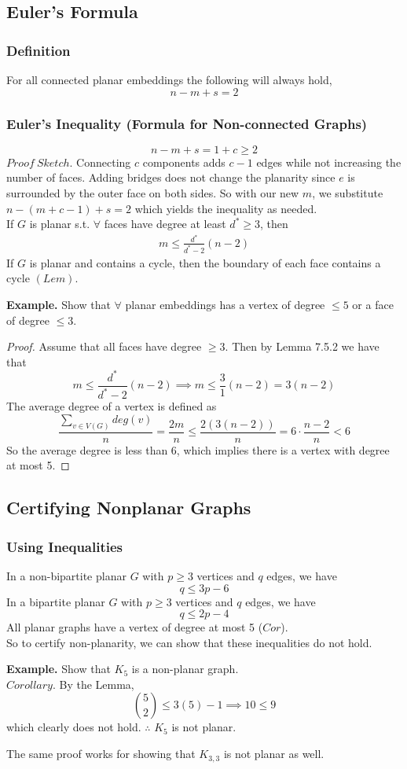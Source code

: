 \documentclass[11pt]{article}
\newenvironment{eg}[1]{
\begin{tcolorbox}[colback = white!15, arc=0pt,outer arc=0pt, colframe = black]
{\color{black} \textbf{Example.} #1} \\[5pt]
}
{
\end{tcolorbox}
}
\newcommand{\nl}{\\[5pt]}
\begin{document}
\subsection{Euler's Formula}
\subsubsection{Definition}
For all connected planar embeddings the following will always hold, 
$$n-m+s = 2$$

\subsubsection{Euler's Inequality (Formula for Non-connected Graphs)}
$$n -m + s = 1 + c \geq 2$$ 
$Proof \: Sketch.$ Connecting $c$ components adds $c-1$ edges while not increasing the number of faces. Adding bridges does not change the planarity since $e$ is surrounded by the outer face on both sides. So with our new $m$, we substitute $n- (m+c-1) +s = 2$ which yields the inequality as needed. \hfill \qedsymbol \nl
If $G$ is planar s.t. $\forall$ faces have degree at least $d^* \geq 3$, then 
\begin{align*}m \leq \frac{d^*}{d^*-2}(n-2) \tag*{$(Lem \: 7.5.2)$}\end{align*}
If $G$ is planar and contains a cycle, then the boundary of each face contains a cycle $(Lem)$.
\begin{eg}{Show that $\forall$ planar embeddings has a vertex of degree $\leq 5$ or a face of degree $\leq 3$.}
\vspace{-20pt}
\begin{proof}
 Assume that all faces have degree $\geq 3$. Then by Lemma 7.5.2 we have that
$$m \leq \frac{d^*}{d^*-2}(n-2) \implies m \leq \frac{3}{1}(n-2) = 3(n-2)$$
The average degree of a vertex is defined as
$$\frac{\sum_{v \in V(G)} deg(v)}{n} = \frac{2m}{n} \leq \frac{2(3(n-2))}{n} =  6 \cdot \frac{n-2}{n} < 6$$
So the average degree is less than 6, which implies there is a vertex with degree at most 5.
\end{proof}
\end{eg}
\subsection{Certifying Nonplanar Graphs}
\subsubsection{Using Inequalities}
In a non-bipartite planar $G$ with $p \geq 3$ vertices and $q$ edges, we have $$q \leq 3p - 6$$
In a bipartite planar $G$ with $p \geq 3$ vertices and $q$ edges, we have $$q \leq 2p - 4$$
All planar graphs have a vertex of degree at most 5 ($Cor$). \nl 
So to certify non-planarity, we can show that these inequalities do not hold.  
\begin{eg}{Show that $K_5$ is a non-planar graph.}
\vspace{-10pt}
$Corollary.$
By the Lemma, 
$$\binom{5}{2} \leq 3(5) - 1 \implies 10 \leq 9$$ 
which clearly does not hold. $\therefore$ $K_5$ is not planar. \hfill \qedsymbol
\end{eg}
The same proof works for showing that $K_{3,3}$ is not planar as well. 
\end{document}
